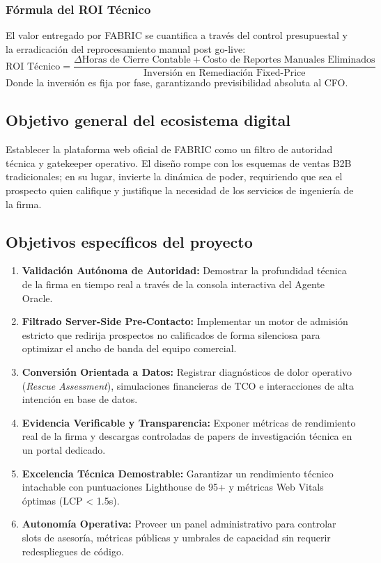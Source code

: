 \documentclass[11pt,letterpaper]{article}
\begin{document}
\subsubsection{Fórmula del ROI Técnico}
El valor entregado por FABRIC se cuantifica a través del control presupuestal y la erradicación del reprocesamiento manual post go-live:
\[ \text{ROI Técnico} = \frac{\Delta \text{Horas de Cierre Contable} + \text{Costo de Reportes Manuales Eliminados}}{\text{Inversión en Remediación Fixed-Price}} \]
Donde la inversión es fija por fase, garantizando previsibilidad absoluta al CFO.

\subsection{Objetivo general del ecosistema digital}
Establecer la plataforma web oficial de FABRIC como un filtro de autoridad técnica y gatekeeper operativo. El diseño rompe con los esquemas de ventas B2B tradicionales; en su lugar, invierte la dinámica de poder, requiriendo que sea el prospecto quien califique y justifique la necesidad de los servicios de ingeniería de la firma.

\subsection{Objetivos específicos del proyecto}
\begin{enumerate}
\item \textbf{Validación Autónoma de Autoridad:} Demostrar la profundidad técnica de la firma en tiempo real a través de la consola interactiva del Agente Oracle.
\item \textbf{Filtrado Server-Side Pre-Contacto:} Implementar un motor de admisión estricto que redirija prospectos no calificados de forma silenciosa para optimizar el ancho de banda del equipo comercial.
\item \textbf{Conversión Orientada a Datos:} Registrar diagnósticos de dolor operativo (\emph{Rescue Assessment}), simulaciones financieras de TCO e interacciones de alta intención en base de datos.
\item \textbf{Evidencia Verificable y Transparencia:} Exponer métricas de rendimiento real de la firma y descargas controladas de papers de investigación técnica en un portal dedicado.
\item \textbf{Excelencia Técnica Demostrable:} Garantizar un rendimiento técnico intachable con puntuaciones Lighthouse de 95+ y métricas Web Vitals óptimas (LCP < 1.5s).
\item \textbf{Autonomía Operativa:} Proveer un panel administrativo para controlar slots de asesoría, métricas públicas y umbrales de capacidad sin requerir redespliegues de código.
\end{enumerate}
\end{document}

